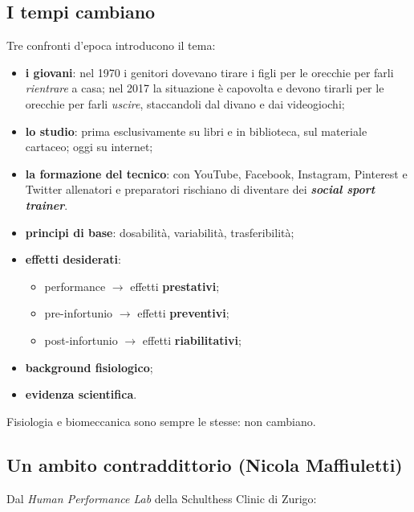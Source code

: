 \subsection{I tempi cambiano}

Tre confronti d'epoca introducono il tema:

\begin{itemize}
  \item \textbf{i giovani}: nel 1970 i genitori dovevano tirare i figli per le orecchie per farli
    \textit{rientrare} a casa; nel 2017 la situazione è capovolta e devono tirarli per le orecchie
    per farli \textit{uscire}, staccandoli dal divano e dai videogiochi;
  \item \textbf{lo studio}: prima esclusivamente su libri e in biblioteca, sul materiale cartaceo;
    oggi su internet;
  \item \textbf{la formazione del tecnico}: con YouTube, Facebook, Instagram, Pinterest e Twitter
    allenatori e preparatori rischiano di diventare dei \textbf{\textit{social sport trainer}}.
\end{itemize}

\begin{itemize}
  \item \textbf{principi di base}: dosabilità, variabilità, trasferibilità;
  \item \textbf{effetti desiderati}:
    \begin{itemize}
      \item performance $\rightarrow$ effetti \textbf{prestativi};
      \item pre-infortunio $\rightarrow$ effetti \textbf{preventivi};
      \item post-infortunio $\rightarrow$ effetti \textbf{riabilitativi};
    \end{itemize}
  \item \textbf{background fisiologico};
  \item \textbf{evidenza scientifica}.
\end{itemize}

Fisiologia e biomeccanica sono sempre le stesse: non cambiano.

\subsection{Un ambito contraddittorio (Nicola Maffiuletti)}

Dal \textit{Human Performance Lab} della Schulthess Clinic di Zurigo:

